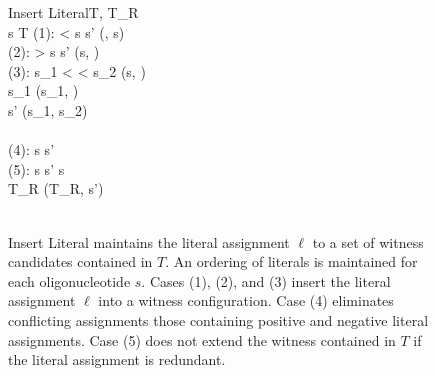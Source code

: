 

\begin{figure}[htbp]
\begin{center}

	\begin{pseudocode}{Insert Literal}{T, \ell}
		T_R \GETS \emptyset \\
		\FOREACH {} s  T \DO
			\BEGIN
				\CASE(1): \ell < s \THEN
					s' \GETS {}(\ell, s)\\
				\CASE(2): \ell > s \THEN
					s' \GETS {}(s, \ell)\\
				\CASE(3): s_1 < \ell < s_2 \THEN
					\BEGIN
					[s_1, s_2] \GETS {}(s, \ell)\\
					s_1 \GETS {}(s_1, \ell)\\
					s' \GETS {}(s_1, s_2)\\
					\END \\
				\CASE(4): \neg \ell \in s \THEN
					s' \GETS \emptyset \\
				\CASE(5): \ell \in s \THEN
					s' \GETS s\\
				T_R \GETS {}(T_R, s') \\
			\END \\
	\end{pseudocode}

\caption{{\sc Insert Literal} maintains the literal assignment $\ell$ to a set of witness candidates contained in $T$.  An ordering of literals is maintained for each oligonucleotide $s$.  Cases (1), (2), and (3) insert the literal assignment $\ell$ into a witness configuration.  Case (4) eliminates conflicting assignments those containing positive and negative literal assignments.  Case (5) does not extend the witness contained in $T$ if the literal assignment is redundant.}
\label{insertVariableAlgorithm}
\end{center}
\end{figure}

